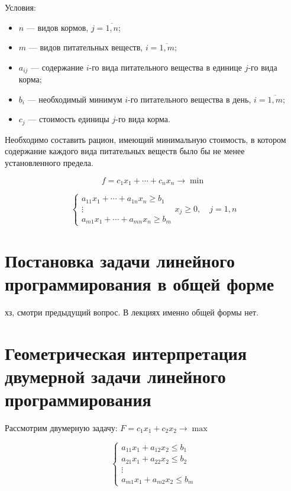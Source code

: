 \documentclass[17pt]{extarticle}
\begin{document}
\begin{definition}
    Условия:
    \begin{itemize}
        \item \( n \) — видов кормов, \( j =\overline{1, n} \);
        \item \( m \) — видов питательных веществ, \( i =\overline{1, m} \);
        \item \( a_{ij} \) — содержание \( i \)-го вида питательного вещества в единице \( j \)-го вида корма;
        \item \( b_i \) — необходимый минимум \( i \)-го питательного вещества в день, \( i=\overline{1,m} \);
        \item \( c_j \) — стоимость единицы \( j \)-го вида корма.
    \end{itemize}

    Необходимо составить рацион, имеющий минимальную стоимость, в котором содержание каждого вида питательных веществ было бы не менее установленного предела.

    \[
        f = c_1 x_1 + \cdots + c_n x_n \rightarrow \min
    \]

    \[
        \begin{cases}
            a_{11} x_1 + \cdots + a_{1n} x_n \geq b_1 \\
            \vdots                                    \\
            a_{m1} x_1 + \cdots + a_{mn} x_n \geq b_m
        \end{cases} x_j \geq 0, \quad j = 1, n
    \]
\end{definition}




\section{Постановка задачи линейного программирования в общей форме}
хз, смотри предыдущий вопрос. В лекциях именно общей формы нет.


\section{Геометрическая интерпретация двумерной задачи линейного программирования}

Рассмотрим двумерную задачу: \(F = c_1 x_1 + c_2 x_2 \rightarrow \max\)

\[
    \begin{cases}
        a_{11}x_1 + a_{12}x_2 \leq b_1 \\
        a_{21}x_1 + a_{22}x_2 \leq b_2 \\
        \vdots                         \\
        a_{m1}x_1 + a_{m2}x_2 \leq b_m
    \end{cases}
\]
\end{document}
